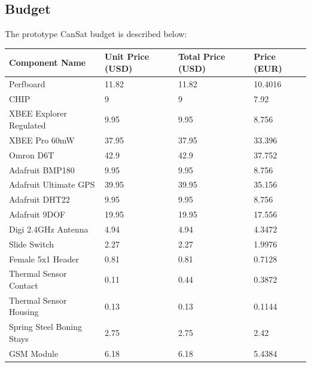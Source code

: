 \documentclass[]{report}
\begin{document}
		\subsection{Budget}
		
		The prototype CanSat budget is described below:
		
		\begin{center}
			\begin{longtable}{llll}
				Component Name                 & Unit Price (USD) & Total Price (USD) & Price (EUR) \\ \hline
				Perfboard                      & 11.82            & 11.82             & 10.4016     \\
				CHIP                           & 9                & 9                 & 7.92        \\
				XBEE Explorer Regulated        & 9.95             & 9.95              & 8.756       \\
				XBEE Pro 60mW                  & 37.95            & 37.95             & 33.396      \\
				Omron D6T                      & 42.9             & 42.9              & 37.752      \\
				Adafruit BMP180                & 9.95             & 9.95              & 8.756       \\
				Adafruit Ultimate GPS          & 39.95            & 39.95             & 35.156      \\
				Adafruit DHT22                 & 9.95             & 9.95              & 8.756       \\
				Adafruit 9DOF                  & 19.95            & 19.95             & 17.556      \\
				Digi 2.4GHz Antenna            & 4.94             & 4.94              & 4.3472      \\
				Slide Switch                   & 2.27             & 2.27              & 1.9976      \\
				Female 5x1 Header              & 0.81             & 0.81              & 0.7128      \\
				Thermal Sensor Contact         & 0.11             & 0.44              & 0.3872      \\
				Thermal Sensor Housing         & 0.13             & 0.13              & 0.1144      \\
				Spring Steel Boning Stays      & 2.75             & 2.75              & 2.42        \\
				GSM Module                     & 6.18             & 6.18              & 5.4384      \\

\end{longtable}
\end{center}
\end{document}
